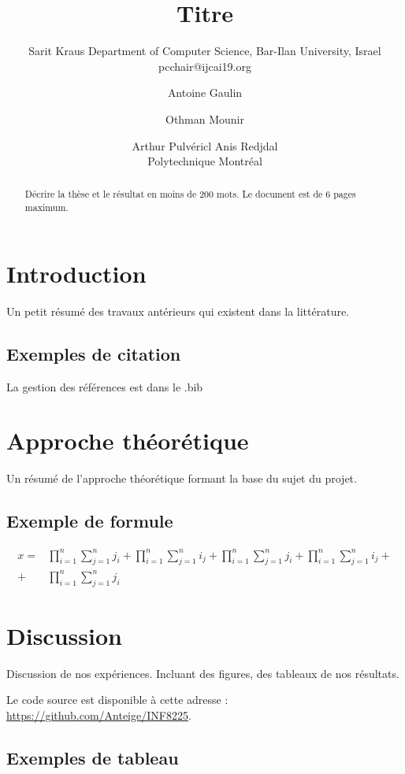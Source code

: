 \documentclass{article}
\title{Titre}
\author{
    Sarit Kraus
    \affiliations
    Department of Computer Science, Bar-Ilan University, Israel \emails
    pcchair@ijcai19.org
}
\author{
Antoine Gaulin\and
Othman Mounir\and
Arthur Pulvéricl\And
Anis Redjdal\\
\affiliations
Polytechnique Montréal\\
}
\begin{document}
\maketitle

\begin{abstract}
Décrire la thèse et le résultat en moins de 200 mots. Le document est de 6 pages maximum.
\end{abstract}

\section{Introduction}

Un petit résumé des travaux antérieurs qui existent dans la littérature.

\subsection{Exemples de citation}

La gestion des références est dans le .bib ~\cite{gottlob:nonmon}

\section{Approche théorétique}

Un résumé de l'approche théorétique formant la base du sujet du projet.

\subsection{Exemple de formule}

\begin{align}
    x =& \prod_{i=1}^n \sum_{j=1}^n j_i + \prod_{i=1}^n \sum_{j=1}^n i_j + \prod_{i=1}^n \sum_{j=1}^n j_i + \prod_{i=1}^n \sum_{j=1}^n i_j + \nonumber\\
    + & \prod_{i=1}^n \sum_{j=1}^n j_i
\end{align}

\section{Discussion}

Discussion de nos expériences. Incluant des figures, des tableaux de nos résultats.

Le code source est disponible à cette adresse : \url{https://github.com/Anteige/INF8225}.

\subsection{Exemples de tableau}
\end{document}
